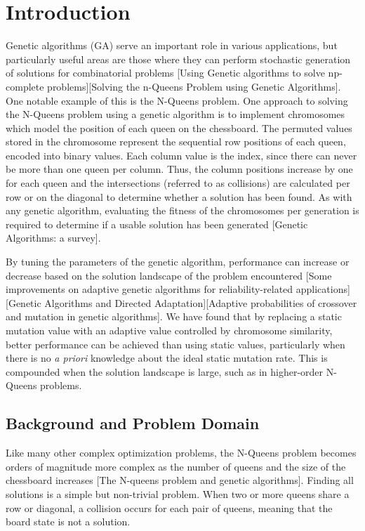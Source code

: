 \documentclass{sig-alternate}
\begin{document}




% 
%
\section{Introduction}
Genetic algorithms (GA) serve an important role in various applications, but particularly useful areas are those where they can perform stochastic generation of solutions for combinatorial problems [Using Genetic algorithms to solve np-complete problems][Solving the n-Queens Problem using Genetic Algorithms]. One notable example of this is the N-Queens problem. One approach to solving the N-Queens problem using a genetic algorithm is to implement chromosomes which model the position of each queen on the chessboard. The permuted values stored in the chromosome represent the sequential row positions of each queen, encoded into binary values. Each column value is the index, since there can never be more than one queen per column. Thus, the column positions increase by one for each queen and the intersections (referred to as collisions) are calculated per row or on the diagonal to determine whether a solution has been found. As with any genetic algorithm, evaluating the fitness of the chromosomes per generation is required to determine if a usable solution has been generated [Genetic Algorithms: a survey]. 

By tuning the parameters of the genetic algorithm, performance can increase or decrease based on the solution landscape of the problem encountered [Some improvements on adaptive genetic algorithms for reliability-related applications][Genetic Algorithms and Directed Adaptation][Adaptive probabilities of crossover and mutation in genetic algorithms]. We have found that by replacing a static mutation value with an adaptive value controlled by chromosome similarity, better performance can be achieved than using static values, particularly when there is no \emph{a priori} knowledge about the ideal static mutation rate. This is compounded when the solution landscape is large, such as in higher-order N-Queens problems.

\subsection{Background and Problem Domain}
Like many other complex optimization problems, the N-Queens problem becomes orders of magnitude more complex as the number of queens and the size of the chessboard increases [The N-queens problem and genetic algorithms]. Finding all solutions is a simple but non-trivial problem. When two or more queens share a row or diagonal, a collision occurs for each pair of queens, meaning that the board state is not a solution.
\end{document}
